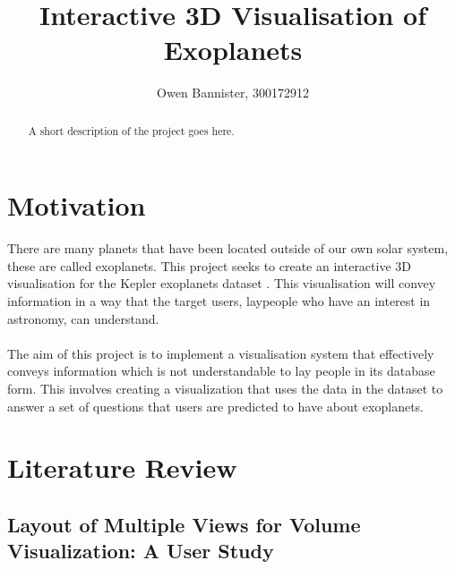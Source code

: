 \documentclass[11pt
              , a4paper
              , twoside
              , openright
              ]{report}
\title{Interactive 3D Visualisation of Exoplanets}
\author{Owen Bannister, 300172912}
\date{}
\begin{document}
\frontmatter



\begin{abstract}

A short description of the project goes here.

\end{abstract}


\maketitle


\tableofcontents



\mainmatter


\chapter{Motivation}
There are many planets that have been located outside of our own solar system, these are called exoplanets. This project seeks to create an interactive 3D visualisation for the Kepler exoplanets dataset \cite{dataset}.  This visualisation will convey information in a way that the target users, laypeople who have an interest in astronomy, can understand.
\\\\
The aim of this project is to implement a visualisation system that effectively conveys information which is not understandable to lay people in its database form. This involves creating a visualization that uses the data in the dataset to answer a set of questions that users are predicted to have about exoplanets.

\chapter{Literature Review}
\section{Layout of Multiple Views for Volume Visualization: A User Study}
\end{document}
